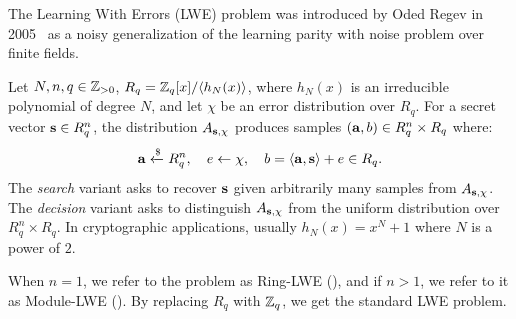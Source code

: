 
The Learning With Errors (LWE) problem was introduced by Oded Regev in 2005~\cite{STOC:Regev05} as a noisy generalization of the learning parity with noise problem over finite fields.




\begin{definition}
    Let $N, n, q \in \mathbb{Z}_{>0}$, $R_q = \mathbb{Z}_q[x]/\langle h_N(x) \rangle$, where $h_N(x)$ is an irreducible polynomial of degree $N$, and let $\chi$ be an error distribution over $R_q$.
    For a secret vector $\mathbf{s} \in R_q^n$, the distribution $A_{\mathbf{s},\chi}$ produces samples $(\mathbf{a}, b) \in R_q^n \times R_q$ where:
    \[
        \mathbf{a} \xleftarrow{\$} R_q^n, \quad e \leftarrow \chi, \quad b = \langle \mathbf{a}, \mathbf{s} \rangle + e \in R_q.
    \]
    The \emph{search} variant asks to recover $\mathbf{s}$ given arbitrarily many samples from $A_{\mathbf{s},\chi}$. The \emph{decision} variant asks to distinguish $A_{\mathbf{s},\chi}$ from the uniform distribution over $R_q^n \times R_q$.
    In cryptographic applications, usually $h_N(x)=x^N+1$ where $N$ is a power of $2$.

    When $n=1$, we refer to the problem as Ring-LWE (\rlwe), and if $n>1$, we refer to it as Module-LWE (\mlwe). By replacing \(R_q\) with \(\mathbb{Z}_q\), we get the standard LWE problem.

    
\end{definition}


